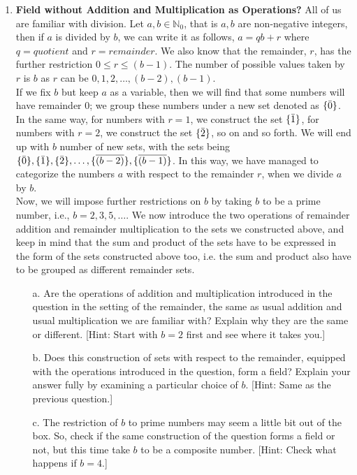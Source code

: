 \begin{enumerate}[label=\textbf{\arabic*.}]
    \item \textbf{Field without Addition and Multiplication as Operations?} All of us are familiar with division. Let $a,b\in\mathbb{N}_0$, that is $a,b$ are non-negative integers, then if $a$ is divided by $b$, we can write it as follows, $a=qb+r$ where $q=quotient$ and $r=remainder$. We also know that the remainder, $r$, has the further restriction $0\leq r\leq (b-1)$. The number of possible values taken by $r$ is $b$ as $r$ can be $0,1,2,\dots,(b-2),(b-1)$.\\
    If we fix $b$ but keep $a$ as a variable, then we will find that some numbers will have remainder $0$; we group these numbers under a new set denoted as $\{\Bar{0}\}$. In the same way, for numbers with $r=1$, we construct the set $\{\Bar{1}\}$, for numbers with $r=2$, we construct the set $\{\Bar{2}\}$, so on and so forth. We will end up with $b$ number of new sets, with the sets being $\{\Bar{0}\},\{\Bar{1}\},\{\Bar{2}\},\dots,\{\overline{(b-2)}\},\{\overline{(b-1)}\}$. In this way, we have managed to categorize the numbers $a$ with respect to the remainder $r$, when we divide $a$ by $b$.\\
    Now, we will impose further restrictions on $b$ by taking $b$ to be a prime number, i.e., $b=2,3,5,\dots$. We now introduce the two operations of remainder addition and remainder multiplication to the sets we constructed above, and keep in mind that the sum and product of the sets have to be expressed in the form of the sets constructed above too, i.e. the sum and product also have to be grouped as different remainder sets.
    \begin{enumerate}
        \item[a.] Are the operations of addition and multiplication introduced in the question in the setting of the remainder, the same as usual addition and usual multiplication we are familiar with? Explain why they are the same or different. [Hint: Start with $b=2$ first and see where it takes you.]
        \item[b.] Does this construction of sets with respect to the remainder, equipped with the operations introduced in the question, form a field? Explain your answer fully by examining a particular choice of $b$. [Hint: Same as the previous question.]
        \item[c.] The restriction of $b$ to prime numbers may seem a little bit out of the box. So, check if the same construction of the question forms a field or not, but this time take $b$ to be a composite number. [Hint: Check what happens if $b=4$.]

\end{enumerate}
\end{enumerate}

